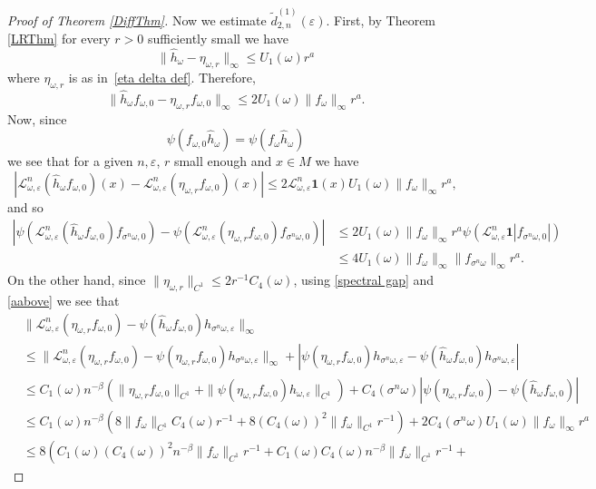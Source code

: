 \documentclass[11pt,reqno,a4paper]{article}
\theoremstyle{special}
\def\om{\omega}
\begin{document}
\begin{proof}[Proof of Theorem \ref{DiffThm}]
Now we estimate $\tilde d_{2,n}^{(1)}(\varepsilon)$.
First, by Theorem \ref{LRThm}  for every $r>0$ sufficiently small we have
$$
\|\hat h_\om-\eta_{\om,r}\|_\infty\leq U_1(\om)r^a
$$
where $\eta_{\om,r}$ is as in~\eqref{eta delta def}. Therefore, 
\begin{equation}\label{aabove}
 \|\hat h_\om f_{\om,0}-\eta_{\om,r} f_{\om, 0}\|_\infty\leq 2U_1(\om)\|f_\om\|_\infty r^a.   
\end{equation}
Now, since 
$$
\psi(f_{\om,0}\hat h_\om)=\psi(f_\om  \hat h_\omega)
$$
we see that for a given $n,\varepsilon$, $r$ small enough and $x\in M$ we have 
$$
|\mathcal L_{\om, \varepsilon}^n(\hat h_\om f_{\om, 0})(x)-\mathcal L_{\om, \varepsilon}^n(\eta_{\om,r}f_{\om, 0})(x)|\leq 2\mathcal L_{\om, \varepsilon}^n\textbf{1}(x)
U_1(\om)\|f_\om\|_\infty r^a,
$$
and so 
\[
\begin{split}
\left|\psi(\mathcal L_{\om, \varepsilon}^n(\hat h_\om f_{\om, 0})f_{\sigma^n\om, 0})-\psi(\mathcal L_{\om, \varepsilon}^n(\eta_{\om,r}f_{\om, 0})f_{\sigma^n\om, 0})\right| &\leq 2U_1(\om)\|f_\om\|_\infty r^a\psi(\mathcal L_{\om, \varepsilon}^n\textbf{1}|f_{\sigma^n\om, 0}|)  \\
&\leq 4U_1(\om)\|f_\om\|_\infty\|f_{\sigma^n\om}\|_\infty r^a.
\end{split}
\]
On the other hand, since $\|\eta_{\om,r}\|_{C^1}\leq 2r^{-1}C_4(\om)$,  using \eqref{spectral gap} and \eqref{aabove} we see that
\[
\begin{split}
&\|\mathcal L_{\om, \varepsilon}^n(\eta_{\om,r} f_{\om, 0})-\psi(\hat h_\om f_{\om, 0})h_{\sigma^n\om, \varepsilon}\|_\infty 
 \\
 &\leq
\|\mathcal L_{\om, \varepsilon}^n(\eta_{\om,r} f_{\om, 0})-\psi(\eta_{\om,r}f_{\om, 0})h_{\sigma^n\om, \varepsilon}\|_\infty 
+|\psi(\eta_{\om,r}f_{\om, 0})h_{\sigma^n\om, \varepsilon}-\psi(\hat h_\om f_{\om, 0})h_{\sigma^n\om, \varepsilon}| 
\\ 
&\leq C_1(\om)n^{-\beta} (\| \eta_{\om, r}f_{\om, 0}\|_{C^1}+\|\psi(\eta_{\om, r}f_{\om, 0})h_{\om, \varepsilon}\|_{C^1})+C_4(\sigma^n \om)|\psi(\eta_{\om,r}f_{\om, 0})-\psi(\hat h_\om f_{\om, 0})|\\
&\leq C_1(\om)n^{-\beta}(8\|f_\om\|_{C^1}C_4(\om)r^{-1}+8(C_4(\om))^2\|f_\om\|_{C^1}r^{-1}) +2C_4(\sigma^n \om)U_1(\om)\|f_\om\|_\infty r^a \\
&\leq   8\left(C_1(\om)(C_4(\om))^2n^{-\beta}\|f_\om\|_{C^1} r^{-1}+C_1(\om)C_4(\om)n^{-\beta}\|f_\om\|_{C^1}r^{-1}+

\end{split}\]
\end{proof}
\end{document}
